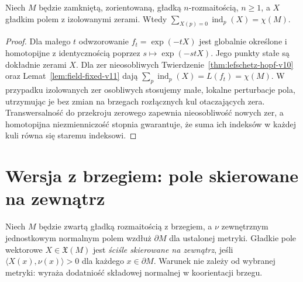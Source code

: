 \begin{wniosek}
Niech $M$ będzie zamkniętą, zorientowaną, gładką
$n$-rozmaitością, $n\ge1$, a $X$ gładkim polem z izolowanymi
zerami. Wtedy $\sum_{X(p)=0}\operatorname{ind}_p(X)=\chi(M)$.
\end{wniosek}
\begin{proof}
Dla małego $t$ odwzorowanie $f_t=\exp(-tX)$ jest globalnie
określone i homotopijne z identycznością poprzez
$s\mapsto\exp(-stX)$. Jego punkty stałe są dokładnie zerami $X$.
Dla zer nieosobliwych Twierdzenie~\ref{thm:lefschetz-hopf-v10}
oraz Lemat~\ref{lem:field-fixed-v11} dają
$\sum_p\operatorname{ind}_p(X)=L(f_t)=\chi(M)$.
W przypadku izolowanych zer osobliwych stosujemy małe,
lokalne perturbacje pola, utrzymując je bez zmian na brzegach
rozłącznych kul otaczających zera. Transwersalność do
przekroju zerowego zapewnia nieosobliwość nowych zer,
a homotopijna niezmienniczość stopnia gwarantuje, że suma
ich indeksów w każdej kuli równa się staremu indeksowi.
\end{proof}

\section{Wersja z brzegiem: pole skierowane na zewnątrz}
\begin{definicja}
Niech $M$ będzie zwartą gładką rozmaitością z brzegiem,
a $\nu$ zewnętrznym jednostkowym normalnym polem
wzdłuż $\partial M$ dla ustalonej metryki.
Gładkie pole wektorowe $X\in\mathfrak X(M)$ jest
\emph{ściśle skierowane na zewnątrz},
jeśli $\langle X(x),\nu(x)\rangle>0$ dla każdego
$x\in\partial M$. Warunek nie zależy od wybranej metryki:
wyraża dodatniość składowej normalnej w koorientacji brzegu.
\end{definicja}

